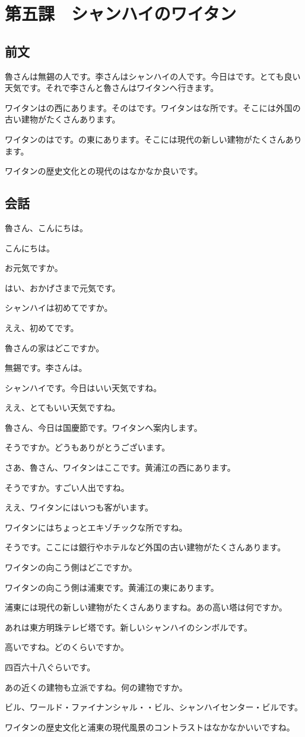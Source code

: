 \documentclass[a5j]{ltjtarticle}
\newcommand*{\RuSpeaks}{\item[魯]}
\newcommand*{\LiSpeaks}{\item[李]}
\begin{document}
\section*{第五課　シャンハイのワイタン}

\subsection*{前文}

魯さんは無錫の人です。李さんはシャンハイの人です。今日はです。とても良い天気です。それで李さんと魯さんはワイタンへ行きます。

ワイタンはの西にあります。そのはです。ワイタンはな所です。そこには外国の古い建物がたくさんあります。

ワイタンのはです。の東にあります。そこには現代の新しい建物がたくさんあります。

ワイタンの歴史文化との現代のはなかなか良いです。

\subsection*{会話}

\begin{dialogue}[labelwidth=\zw]
  \LiSpeaks 魯さん、こんにちは。
  \RuSpeaks こんにちは。
  \LiSpeaks お元気ですか。
  \RuSpeaks はい、おかげさまで元気です。
  \LiSpeaks シャンハイは初めてですか。
  \RuSpeaks ええ、初めてです。
  \LiSpeaks 魯さんの家はどこですか。
  \RuSpeaks 無錫です。李さんは。
  \LiSpeaks シャンハイです。今日はいい天気ですね。
  \RuSpeaks ええ、とてもいい天気ですね。
  \LiSpeaks 魯さん、今日は国慶節です。ワイタンへ案内します。
  \RuSpeaks そうですか。どうもありがとうございます。
\item[]
  \LiSpeaks さあ、魯さん、ワイタンはここです。黄浦江の西にあります。
  \RuSpeaks そうですか。すごい人出ですね。
  \LiSpeaks ええ、ワイタンにはいつも客がいます。
  \RuSpeaks ワイタンにはちょっとエキゾチックな所ですね。
  \LiSpeaks そうです。ここには銀行やホテルなど外国の古い建物がたくさんあります。
  \RuSpeaks ワイタンの向こう側はどこですか。
  \LiSpeaks ワイタンの向こう側は浦東です。黄浦江の東にあります。
  \RuSpeaks 浦東には現代の新しい建物がたくさんありますね。あの高い塔は何ですか。
  \LiSpeaks あれは東方明珠テレビ塔です。新しいシャンハイのシンボルです。
  \RuSpeaks 高いですね。どのくらいですか。
  \LiSpeaks 四百六十八ぐらいです。
  \RuSpeaks あの近くの建物も立派ですね。何の建物ですか。
  \LiSpeaks {}ビル、ワールド・ファイナンシャル・・ビル、シャンハイセンター・ビルです。
  \RuSpeaks ワイタンの歴史文化と浦東の現代風景のコントラストはなかなかいいですね。
\end{dialogue}
\end{document}
